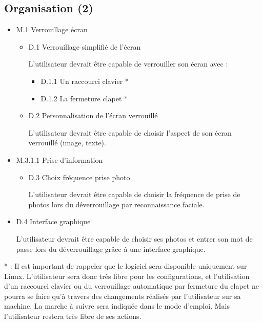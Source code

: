   \subsection{Organisation (2)}
  \begin{itemize}
  \item{M.1 Verrouillage écran}
    \begin{itemize}
    \item{D.1 Verrouillage simplifié de l’écran}

    L’utilisateur devrait être capable de verrouiller son écran avec :
      \begin{itemize}
      \item{D.1.1 Un raccourci clavier *}
      \item{D.1.2 La fermeture clapet *}
      \\
      \end{itemize}
      \item{D.2 Personnalisation de l’écran verrouillé}

      L’utilisateur devrait être capable de choisir l’aspect 	de son écran
      verrouillé (image, texte).
      \\
    \end{itemize}
    \item{M.3.1.1 Prise d’information}
    \begin{itemize}
      \item{D.3 Choix fréquence prise photo}

      L’utilisateur devrait être capable de choisir la 	fréquence de prise de
      photos lors du déverrouillage par reconnaissance faciale.
      \\
    \end{itemize}
    \item{D.4 Interface graphique}

    L’utilisateur devrait être capable de choisir ses photos et entrer son mot
    de passe lors du déverrouillage grâce à une interface graphique.
  \end{itemize}
\vspace{0.5cm}

* : Il est important de rappeler que le logiciel sera disponible uniquement sur
Linux. L'utilisateur sera donc très libre pour les configurations, et l'utilisation
d'un raccourci clavier ou du verrouillage automatique par fermeture du clapet
ne pourra se faire qu'à travers des changements réalisés par l'utilisateur sur sa machine. La
marche à suivre sera indiquée dans le mode d'emploi. Mais l'utilisateur restera
très libre de ses actions.

